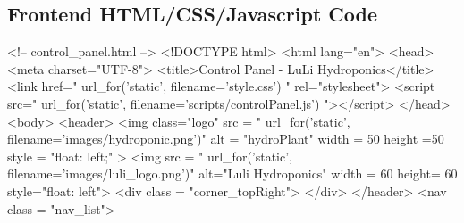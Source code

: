 \documentclass[12pt]{article} %
\begin{document}
\subsection{Frontend HTML/CSS/Javascript Code}
\begin{htmlcode}[caption={Control Panel Html}]

    <!-- control_panel.html -->
    <!DOCTYPE html>
    <html lang="en">
    <head>
    <meta charset="UTF-8">
    <title>Control Panel - LuLi Hydroponics</title>
    <link href="{{ url_for('static', filename='style.css') }}" rel="stylesheet">
    <script src="{{ url_for('static', filename='scripts/controlPanel.js') }}"></script>
    </head>
    <body>
    <header>
        <img class="logo" src = "{{ url_for('static', filename='images/hydroponic.png')}}" alt = "hydroPlant"  width = 50 height =50 style = "float: left;" >   
        <img src = "{{ url_for('static', filename='images/luli_logo.png')}}" alt="Luli Hydroponics" width = 60 height= 60 style="float: left">
        <div class = "corner_topRight"> </div>
    </header>
    <nav class = "nav_list">
          

\end{htmlcode}
\end{document}
